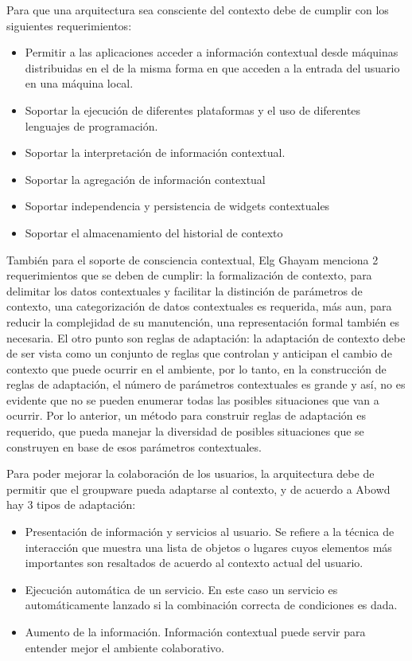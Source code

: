 Para que una arquitectura sea consciente del contexto debe de cumplir con los siguientes requerimientos\cite{dey1999architecture}:

\begin{itemize}
\item Permitir a las aplicaciones acceder a informaci\'on contextual desde m\'aquinas distribuidas en el de la misma forma en que acceden a la entrada del usuario en una m\'aquina local.
\item Soportar la ejecuci\'on de diferentes plataformas y el uso de diferentes lenguajes de programaci\'on.
\item Soportar la interpretaci\'on de informaci\'on contextual.
\item Soportar la agregaci\'on de informaci\'on contextual
\item Soportar independencia y persistencia de widgets contextuales
\item Soportar el almacenamiento del historial de contexto
\end{itemize}

Tambi\'en para el soporte de consciencia contextual, Elg Ghayam \cite{el2011distributed} menciona 2 requerimientos que se deben de cumplir: la formalizaci\'on de contexto, para delimitar los datos contextuales y facilitar la distinci\'on de par\'ametros de contexto, una categorizaci\'on de datos contextuales es requerida, m\'as aun, para reducir la complejidad de su manutenci\'on, una representaci\'on formal tambi\'en es necesaria. El otro punto son reglas de adaptaci\'on: la adaptaci\'on de contexto debe de ser vista como un conjunto de reglas que controlan y anticipan el cambio de contexto que puede ocurrir en el ambiente, por lo tanto, en la construcci\'on de reglas de adaptaci\'on, el n\'umero de par\'ametros contextuales es grande y as\'i, no es evidente que no se pueden enumerar todas las posibles situaciones que van a ocurrir. Por lo anterior, un m\'etodo para construir reglas de adaptaci\'on es requerido, que pueda manejar la diversidad de posibles situaciones que se construyen en base de esos par\'ametros contextuales.

Para poder mejorar la colaboraci\'on de los usuarios, la arquitectura debe de permitir que el groupware pueda adaptarse al contexto, y de acuerdo a Abowd\cite{abowd1999towards} hay 3 tipos de adaptaci\'on:
\begin{itemize}
\item  Presentaci\'on de informaci\'on y servicios al usuario. Se refiere a la t\'ecnica de interacci\'on que muestra una lista de objetos o lugares cuyos elementos m\'as importantes son resaltados de acuerdo al contexto actual del usuario.
\item Ejecuci\'on autom\'atica de un servicio. En este caso un servicio es autom\'aticamente lanzado si la combinaci\'on correcta de condiciones es dada.
\item Aumento de la informaci\'on. Informaci\'on contextual puede servir para entender mejor el ambiente colaborativo.
\end{itemize}

